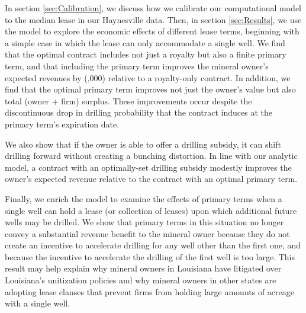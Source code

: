 \documentclass[12pt]{article}
\begin{document}
In section \ref{sec:Calibration}, we discuss how we calibrate our computational model to the median lease in our Haynesville data. Then, in section \ref{sec:Results}, we use the model to explore the economic effects of different lease terms, beginning with a simple case in which the lease can only accommodate a single well. We find that the optimal contract includes not just a royalty but also a finite primary term, and that including the primary term improves the mineral owner's expected revenues by  (\unskip ,000) relative to a royalty-only contract. In addition, we find that the optimal primary term improves not just the owner's value but also total (owner + firm) surplus. These improvements occur despite the discontinuous drop in drilling probability that the contract induces at the primary term's expiration date.

We also show that if the owner is able to offer a drilling subsidy, it can shift drilling forward without creating a bunching distortion. In line with our analytic model, a contract with an optimally-set drilling subsidy modestly improves the owner's expected revenue relative to the contract with an optimal primary term.

Finally, we enrich the model to examine the effects of primary terms when a single well can hold a lease (or collection of leases) upon which additional future wells may be drilled. We show that primary terms in this situation no longer convey a substantial revenue benefit to the mineral owner because they do not create an incentive to accelerate drilling for any well other than the first one, and because the incentive to accelerate the drilling of the first well is too large. This result may help explain why mineral owners in Louisiana have litigated over Louisiana's unitization policies and why mineral owners in other states are adopting lease clauses that prevent firms from holding large amounts of acreage with a single well.
\end{document}
